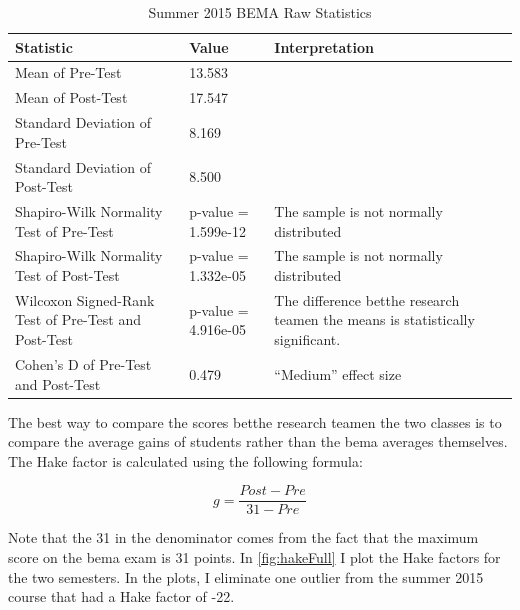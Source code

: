 \pagebreak

\begin{landscape}
\begin{table}[!ht]
  \centering
  \begin{tabular}{|l|l|l|}
    \hline
    \textbf{Statistic} & \textbf{Value} & \textbf{Interpretation}\\
	\hline
	Mean of Pre-Test & 13.583 & \\
	\hline
	Mean of Post-Test & 17.547 & \\
	\hline
	Standard Deviation of Pre-Test & 8.169 & \\
	\hline
	Standard Deviation of Post-Test & 8.500 & \\
	\hline
	Shapiro-Wilk Normality Test of Pre-Test & p-value = 1.599e-12 & The sample is not normally distributed \\
	\hline
	Shapiro-Wilk Normality Test of Post-Test & p-value = 1.332e-05 & The sample is not normally distributed \\
	\hline
	Wilcoxon Signed-Rank Test of Pre-Test and Post-Test & p-value = 4.916e-05 & The difference betthe research teamen the means is statistically significant. \\
	\hline
	Cohen's D of Pre-Test and Post-Test & 0.479 & ``Medium'' effect size \\
	\hline
  \end{tabular}
  \caption{Summer 2015 BEMA Raw Statistics}
  \label{tab:statsSu15}
\end{table}
\end{landscape}

The best way to compare the scores betthe research teamen the two classes is to compare the average gains of students rather than the \gls{bema} averages themselves. The Hake factor is calculated using the following formula:

\begin{equation}
	g = \frac{Post - Pre}{31 - Pre}
\end{equation}

Note that the 31 in the denominator comes from the fact that the maximum score on the \gls{bema} exam is 31 points. In \ref{fig:hakeFull} I plot the Hake factors for the two semesters. In the plots, I eliminate one outlier from the summer 2015 course that had a Hake factor of -22.

